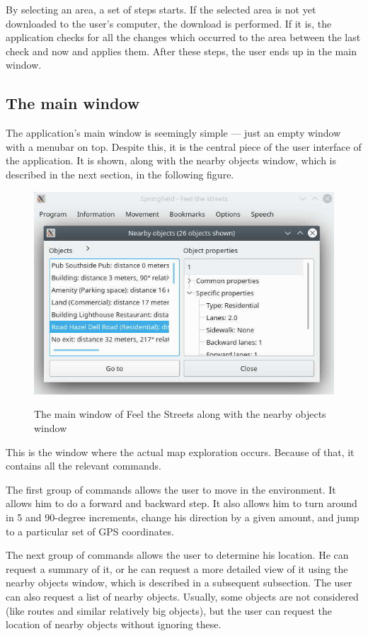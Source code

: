 \documentclass[nolof,digital]{fithesis3}
\begin{document}
By selecting an area, a set of steps starts. If the selected area is not yet downloaded to the user's computer, the download is performed. If it is, the application checks for all the changes which occurred to the area between the last check and now and applies them. After these steps, the user ends up in the main window.
\subsection{The main window}

The application's main window is seemingly simple --- just an empty window with a menubar on top. Despite this, it is the central piece of the user interface of the application. It is shown, along with the nearby objects window, which is described in the next section, in the following figure.
\begin{figure}[h]
\caption{The main window of Feel the Streets along with the nearby objects window}
\includegraphics[width=\textwidth]{feel-the-streets}
\label{fig:fts}
\end{figure}

This is the window where the actual map exploration occurs. Because of that, it contains all the relevant commands.

The first group of commands allows the user to move in the environment. It allows him to do a forward and backward step. It also allows him to turn around in 5 and 90-degree increments, change his direction by a given amount, and jump to a particular set of GPS coordinates.

The next group of commands allows the user to determine his location. He can request a summary of it, or he can request a more detailed view of it using the nearby objects window, which is described in a subsequent subsection. The user can also request a list of nearby objects. Usually, some objects are not considered (like routes and similar relatively big objects), but the user can request the location of nearby objects without ignoring these.
\end{document}

